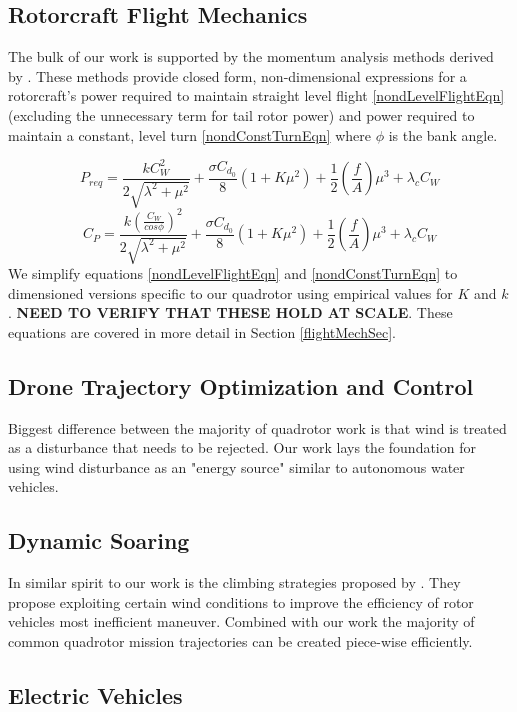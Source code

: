 
\subsection{Rotorcraft Flight Mechanics}
The bulk of our work is supported by the momentum analysis methods derived by \cite{leishman2006principles}. These methods provide closed form, non-dimensional expressions for a rotorcraft's power required to maintain straight level flight \eqref{nondLevelFlightEqn} (excluding the unnecessary term for tail rotor power) and power required to maintain a constant, level turn \eqref{nondConstTurnEqn} where $\phi$ is the bank angle.

\begin{equation}
    \label{nondLevelFlightEqn}
    P_{req} = \frac{k C_W^2}{2\sqrt{\lambda^2+\mu^2}}+\frac{\sigma C_{d_0}}{8}(1+K \mu^2)+\frac{1}{2}(\frac{f}{A})\mu^3+\lambda_c C_W
\end{equation}
\begin{equation}
    \label{nondConstTurnEqn}
    C_P = \frac{k(\frac{C_W}{cos\phi})^2}{2\sqrt{\lambda^2+\mu^2}}+\frac{\sigma C_{d_0}}{8}(1+K \mu^2)+\frac{1}{2}(\frac{f}{A})\mu^3+\lambda_c C_W
\end{equation}
We simplify equations \ref{nondLevelFlightEqn} and \ref{nondConstTurnEqn} to dimensioned versions specific to our quadrotor using empirical values for $K$ and $k$. \textbf{NEED TO VERIFY THAT THESE HOLD AT SCALE}. These equations are covered in more detail in Section \ref{flightMechSec}.

\subsection{Drone Trajectory Optimization and Control}
Biggest difference between the majority of quadrotor work is that wind is treated as a disturbance that needs to be rejected\cite{waslander2009wind}. Our work lays the foundation for using wind disturbance as an "energy source" similar to autonomous water vehicles.

\subsection{Dynamic Soaring}
In similar spirit to our work is the climbing strategies proposed by \cite{zhao2017optimal}. They propose exploiting certain wind conditions to improve the efficiency of rotor vehicles most inefficient maneuver. Combined with our work the majority of common quadrotor mission trajectories can be created piece-wise efficiently.

\subsection{Electric Vehicles}


